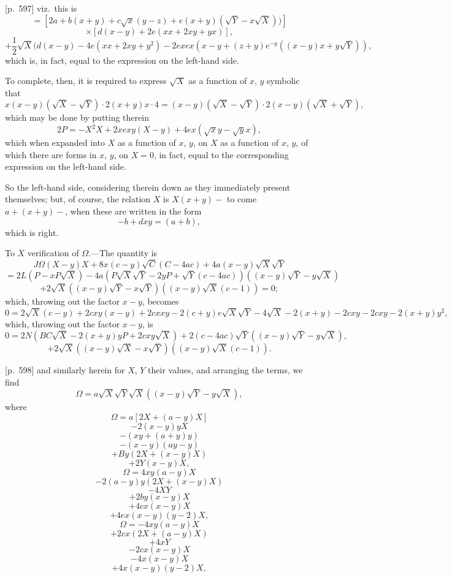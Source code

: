 \documentclass[11pt,a4paper]{book}
\begin{document}
\bigskip

[p.~597] viz.\ this is
\[
= [2a + b(x + y) + c\sqrt{x}(y - z) + e(x + y)(\sqrt{Y} - x\sqrt{X}))]
\]
\[
\times [d(x - y) + 2e(x x + 2xy + y x)],
\]
\[
+ \frac{1}{2}\sqrt{X}(d(x - y) - 4e(x x + 2x y + y^2) - 2ex e x(x - y + (z + y) e^{-y}((x - y)x + y\sqrt{Y})),
\]
which is, in fact, equal to the expression on the left-hand side.

To complete, then, it is required to express $\sqrt{X}$ as a function of $x$, $y$ symbolic that
\[
x(x - y)(\sqrt{X} - \sqrt{Y}) \cdot 2(x + y)x \cdot 4 = (x - y)(\sqrt{X} - \sqrt{Y}) \cdot 2(x - y)(\sqrt{X} + \sqrt{Y}),
\]
which may be done by putting therein
\[
2 P = -X^2 X + 2x ex y (X - y) + 4ex(\sqrt{x} y - \sqrt{y} x),
\]
which when expanded into $X$ as a function of $x$, $y$, on $X$ as a function of $x$, $y$, of which there are forms in $x$, $y$, on $X = 0$, in fact, equal to the corresponding expression on the left-hand side.

So the left-hand side, considering therein down as they immediately present themselves; but, of course, the relation $X$ is $X(x + y) - $ to come $a + (x + y) - $, when these are written in the form
\[
-b + dxy = (a + b),
\]
which is right.

To $X$ verification of $\Omega$.---The quantity is
\[
J\Omega(X - y)X + 8x(c - y)\sqrt{C}(C - 4ac) + 4a(x - y)\sqrt{X}\sqrt{Y}
\]
\[
= 2L(P - x P\sqrt{X}) - 4a(P\sqrt{X}\sqrt{Y} - 2y P + \sqrt{Y}(c - 4ac))((x - y)\sqrt{Y} - y\sqrt{X})
\]
\[
+ 2\sqrt{X}((x - y)\sqrt{Y} - x\sqrt{Y})((x - y)\sqrt{X}(c - 1)) = 0;
\]
which, throwing out the factor $x - y$, becomes
\[
0 = 2\sqrt{X}(c - y) + 2c x y(x - y) + 2c x x y - 2(c + y) e\sqrt{X}\sqrt{Y} - 4 \sqrt{X} - 2(x + y) - 2c x y - 2c x y - 2(x + y) y^2,
\]
which, throwing out the factor $x - y$, is
\[
0 = 2N\left( BC \sqrt{X} - 2(x + y) y P + 2c x y \sqrt{X} \right) + 2(c - 4ac)\sqrt{Y}((x - y)\sqrt{Y} - y \sqrt{X}),
\]
\[
+ 2\sqrt{X}((x - y)\sqrt{X} - x\sqrt{Y})((x - y)\sqrt{X}(c - 1)).
\]

\bigskip

[p.~598] and similarly herein for $X$, $Y$ their values, and arranging the terms, we find
\[
\Omega = a\sqrt{X}\sqrt{Y}\sqrt{X}((x - y)\sqrt{Y} - y\sqrt{X}),
\]
where
\[
\Omega = a [2X + (a - y)X]
\]
\[
- 2(x - y)y X
\]
\[
- (xy + (a + y)y)
\]
\[
- (x - y)(a y - y)
\]
\[
+ By(2X + (x - y)X)
\]
\[
+ 2Y(x - y)X,
\]
\[
\Omega = 4xy(a - y)X
\]
\[
- 2(a - y)y(2X + (x - y)X)
\]
\[
- 4XY
\]
\[
+ 2by(x - y)X
\]
\[
+ 4cx(x - y)X
\]
\[
+ 4ex(x - y)(y - 2)X,
\]
\[
\Omega = -4xy(a - y)X
\]
\[
+ 2cx(2X + (a - y)X)
\]
\[
+ 4xY
\]
\[
- 2cx(x - y)X
\]
\[
- 4x(x - y)X
\]
\[
+ 4x(x - y)(y - 2)X,
\]
\end{document}

